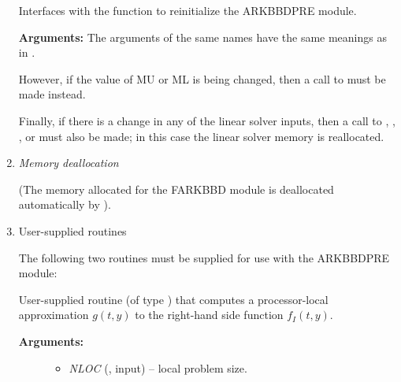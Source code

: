 \documentclass[letterpaper,10pt,english]{sphinxmanual}
\begin{document}
\begin{enumerate}
\begin{fulllineitems}
Interfaces with the
{\hyperref[c_interface/Preconditioners:c.ARKBBDPrecReInit]{\emph{}}} function to reinitialize the
ARKBBDPRE module.

\textbf{Arguments:}  The arguments of the same names have the same
meanings as in {\hyperref[f_interface/Preconditioning:f/_/FARKBBDINIT]{\emph{}}}.

\end{fulllineitems}


However, if the value of MU or ML is being changed, then a call to
{\hyperref[f_interface/Preconditioning:f/_/FARKBBDINIT]{\emph{}}} must be made instead.

Finally, if there is a change in any of the linear solver inputs,
then a call to {\hyperref[f_interface/Usage:f/_/FARKSPGMR]{\emph{}}}, {\hyperref[f_interface/Usage:f/_/FARKSPBCG]{\emph{}}},
{\hyperref[f_interface/Usage:f/_/FARKSPTFQMR]{\emph{}}}, {\hyperref[f_interface/Usage:f/_/FARKSPFGMR]{\emph{}}} or
{\hyperref[f_interface/Usage:f/_/FARKPCG]{\emph{}}} must also be made; in this case the linear
solver memory is reallocated.

\item {} 
\emph{Memory deallocation}

(The memory allocated for the FARKBBD module is deallocated
automatically by {\hyperref[f_interface/Usage:f/_/FARKFREE]{\emph{}}}).

\item {} 
User-supplied routines

The following two routines must be supplied for use with the
ARKBBDPRE module:

\begin{fulllineitems}
\label{f_interface/Preconditioning:f/_/FARKGLOCFN}
User-supplied routine (of type {\hyperref[c_interface/Preconditioners:c.ARKLocalFn]{\emph{}}}) that
computes a processor-local approximation \(g(t,y)\) to
the right-hand side function \(f_I(t,y)\).
\begin{description}
\item[{\textbf{Arguments:}}] \leavevmode\begin{itemize}
\item {} 
\emph{NLOC} (, input) -- local problem size.


\end{itemize}
\end{description}
\end{fulllineitems}
\end{enumerate}
\end{document}
